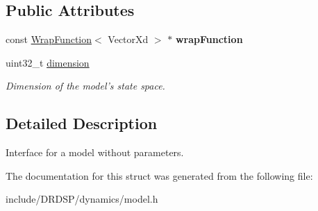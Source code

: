 \subsection*{Public Attributes}
\begin{DoxyCompactItemize}
\item 
\hypertarget{struct_d_r_d_s_p_1_1_model_a286bbeaa673d5e756b1b4e97bdab30f6}{const \hyperlink{struct_d_r_d_s_p_1_1_wrap_function}{Wrap\-Function}$<$ Vector\-Xd $>$ $\ast$ {\bfseries wrap\-Function}}\label{struct_d_r_d_s_p_1_1_model_a286bbeaa673d5e756b1b4e97bdab30f6}

\item 
\hypertarget{struct_d_r_d_s_p_1_1_model_af1e4d4ae5a0dec4460845a58dbd312e9}{uint32\-\_\-t \hyperlink{struct_d_r_d_s_p_1_1_model_af1e4d4ae5a0dec4460845a58dbd312e9}{dimension}}\label{struct_d_r_d_s_p_1_1_model_af1e4d4ae5a0dec4460845a58dbd312e9}

\begin{DoxyCompactList}\small\item\em Dimension of the model's state space. \end{DoxyCompactList}\end{DoxyCompactItemize}


\subsection{Detailed Description}
Interface for a model without parameters. 

The documentation for this struct was generated from the following file\-:\begin{DoxyCompactItemize}
\item 
include/\-D\-R\-D\-S\-P/dynamics/model.\-h\end{DoxyCompactItemize}
